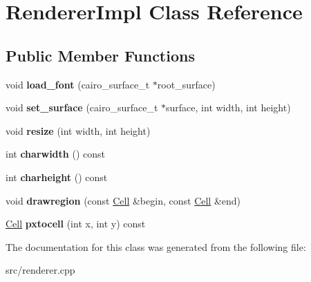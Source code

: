 \hypertarget{classRendererImpl}{}\section{Renderer\+Impl Class Reference}
\label{classRendererImpl}
\subsection*{Public Member Functions}
\begin{DoxyCompactItemize}
\item 
\mbox{\label{classRendererImpl_a59497c910cf989b64286886b4f1d78e4}} 
void {\bfseries load\+\_\+font} (cairo\+\_\+surface\+\_\+t $\ast$root\+\_\+surface)
\item 
\mbox{\label{classRendererImpl_ac351d511e46230f08da9c73b9e020062}} 
void {\bfseries set\+\_\+surface} (cairo\+\_\+surface\+\_\+t $\ast$surface, int width, int height)
\item 
\mbox{\label{classRendererImpl_a73488a3636dcd903ba049f7c61e8c168}} 
void {\bfseries resize} (int width, int height)
\item 
\mbox{\label{classRendererImpl_aa5f045389bb053bda465cc4728eb14ab}} 
int {\bfseries charwidth} () const
\item 
\mbox{\label{classRendererImpl_a4c0618cd1ccb5fe7d4f71f6fde2e06c4}} 
int {\bfseries charheight} () const
\item 
\mbox{\label{classRendererImpl_a047eff14612c13c92ba8e0cf30472684}} 
void {\bfseries drawregion} (const \mbox{\hyperlink{structCell}{Cell}} \&begin, const \mbox{\hyperlink{structCell}{Cell}} \&end)
\item 
\mbox{\label{classRendererImpl_a1b529aee4ff778136688a8110e1047aa}} 
\mbox{\hyperlink{structCell}{Cell}} {\bfseries pxtocell} (int x, int y) const
\end{DoxyCompactItemize}


The documentation for this class was generated from the following file\+:\begin{DoxyCompactItemize}
\item 
src/renderer.\+cpp\end{DoxyCompactItemize}

